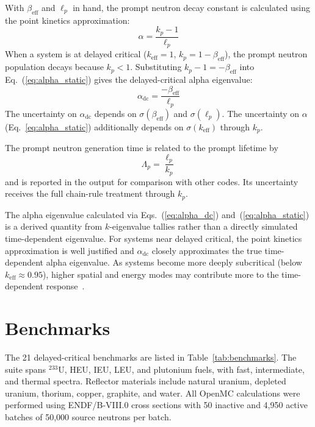\documentclass[12pt,preprint]{elsarticle}
\begin{document}
With $\beta_{\mathrm{eff}}$ and $\ell_p$ in hand, the prompt neutron decay constant is calculated using the point kinetics approximation:
\begin{equation}
\alpha = \frac{k_p - 1}{\ell_p}
\label{eq:alpha_static}
\end{equation}
When a system is at delayed critical ($k_{\mathrm{eff}} = 1$, $k_p = 1 - \beta_{\mathrm{eff}}$), the prompt neutron population decays because $k_p < 1$. Substituting $k_p - 1 = -\beta_{\mathrm{eff}}$ into Eq.~(\ref{eq:alpha_static}) gives the delayed-critical alpha eigenvalue:
\begin{equation}
\alpha_{\mathrm{dc}} = \frac{-\beta_{\mathrm{eff}}}{\ell_p}
\label{eq:alpha_dc}
\end{equation}
The uncertainty on $\alpha_{\mathrm{dc}}$ depends on $\sigma(\beta_{\mathrm{eff}})$ and $\sigma(\ell_p)$. The uncertainty on $\alpha$ (Eq.~\ref{eq:alpha_static}) additionally depends on $\sigma(k_{\mathrm{eff}})$ through $k_p$.

The prompt neutron generation time is related to the prompt lifetime by
\begin{equation}
\Lambda_p = \frac{\ell_p}{k_p}
\label{eq:gentime}
\end{equation}
and is reported in the output for comparison with other codes. Its uncertainty receives the full chain-rule treatment through $k_p$.

The alpha eigenvalue calculated via Eqs.~(\ref{eq:alpha_dc}) and~(\ref{eq:alpha_static}) is a derived quantity from $k$-eigenvalue tallies rather than a directly simulated time-dependent eigenvalue. For systems near delayed critical, the point kinetics approximation is well justified and $\alpha_{\mathrm{dc}}$ closely approximates the true time-dependent alpha eigenvalue. As systems become more deeply subcritical (below $k_{\mathrm{eff}} \approx 0.95$), higher spatial and energy modes may contribute more to the time-dependent response~\cite{spriggs1997}.

\section{Benchmarks}\label{sec:benchmarks}

The 21 delayed-critical benchmarks are listed in Table~\ref{tab:benchmarks}. The suite spans $^{233}$U, HEU, IEU, LEU, and plutonium fuels, with fast, intermediate, and thermal spectra. Reflector materials include natural uranium, depleted uranium, thorium, copper, graphite, and water. All OpenMC calculations were performed using ENDF/B-VIII.0 cross sections with 50 inactive and 4,950 active batches of 50,000 source neutrons per batch.
\end{document}
